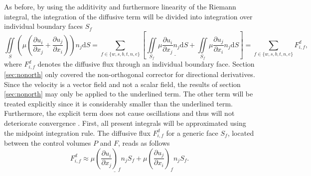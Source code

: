 As before, by using the additivity and furthermore linearity of the Riemann integral, the integration of the diffusive term will be divided into integration over individual boundary faces \(S_f\) 
\begin{displaymath}
  \iint\limits_S \left(\mu \left( \frac{\partial u_i}{\partial x_j} + \frac{\partial u_j}{\partial x_i}\right)\right)n_j \mathrm{d}S 
  = \sum_{f \in \{w,s,b,t,n,e\}} \left[
    \iint\limits_{S_f} \mu \underline{\frac{\partial u_i}{\partial x_j}n_j \mathrm{d}S}
  + \iint\limits_{S_f} \mu \frac{\partial u_j}{\partial x_i}n_j \mathrm{d}S \right]
   = \sum_{f \in \{w,s,b,t,n,e\}} F_{i,f}^{d},
\end{displaymath}
where \(F_{i,f}^{d}\) denotes the diffusive flux through an individual boundary face. Section \ref{sec:nonorth} only covered the non-orthogonal corrector for directional derivatives. Since the velocity is a vector field and not a scalar field, the results of section \ref{sec:nonorth} may only be applied to the underlined term. The other term will be treated explicitly since it is considerably smaller than the underlined term. Furthermore, the explicit term does not cause oscillations and thus will not deteriorate convergence \cite{ferziger02}. First, all present integrals will be approximated using the midpoint integration rule. The diffusive flux \(F_{i,f}^d\) for a generic face \(S_f\), located between the control volumes \(P\) and \(F\), reads as follows
\begin{displaymath}
  F_{i,f}^d \approx \mu \underline{\left(\frac{\partial u_i}{\partial x_j}\right)_f n_j S_f} + \mu \left(\frac{\partial u_j}{\partial x_i}\right)_f n_j S_f.
\end{displaymath}

